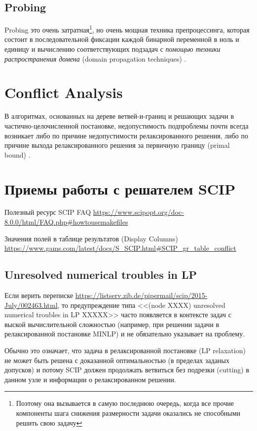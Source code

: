 \documentclass[%
	11pt,
	a4paper,
	utf8,
		]{article}
\begin{document}
\subsection{Probing}

Probing это очень затратная\footnote{Поэтому она вызывается в самую последнюю очередь, когда все прочие компоненты шага снижения размерности задачи оказались не способными решить свою задачу}, но очень мощная техника препроцессинга, которая состоит в последовательной фиксации каждой бинарной переменной в ноль и единицу и вычислению соответствующих подзадач с \emph{помощью техники распространения домена} (domain propagation techniques) \cite[]{achterberg:constr_int_prog}. 

\section{Conflict Analysis}

В алгоритмах, основанных на дереве ветвей-и-границ и решающих задачи в частично-целочисленной постановке, недопустимость подпроблемы почти всегда возникает либо по причине недопустимости релаксированного решения, либо по причине выхода релаксированного решения за первичную границу (primal bound) \cite[]{achterberg:constr_int_prog}. 

\section{Приемы работы с решателем SCIP}

Полезный ресурс SCIP FAQ \url{https://www.scipopt.org/doc-8.0.0/html/FAQ.php#howtousemakefiles}

Значения полей в таблице результатов (Display Columns) \url{https://www.gams.com/latest/docs/S_SCIP.html#SCIP_gr_table_conflict}

\subsection{Unresolved numerical troubles in LP}

Если верить переписке \url{https://listserv.zib.de/pipermail/scip/2015-July/002463.html}, то предупреждение типа <<(node XXXX) unresolved numerical troubles in LP XXXXX>> часто появляется в контексте задач с выской вычислительной сложностью (например, при решении задачи в релаксированной постановке MINLP) и не обязательно указывает на проблему.

Обычно это означает, что задача в релаксированной постановке (LP relaxation) не может быть решена с доказанной оптимальностью (в пределах заданых допусков) и потому SCIP должен продолжать ветвиться без подрезки (cutting) в данном узле и информации о релаксированном решении.
\end{document}
